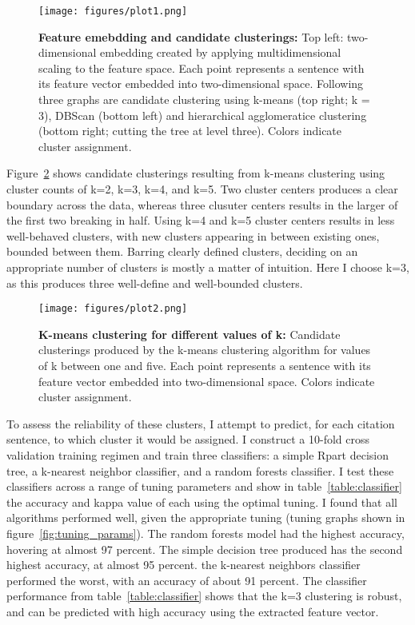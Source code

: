 \documentclass[
10pt, %
a4paper, %
oneside, %
headinclude,footinclude, %
BCOR5mm, %
]{scrartcl}
\begin{document}
\begin{figure}[h]
	\centering
	\texttt{[image: figures/plot1.png]}
	\caption{\textbf{Feature emebdding and candidate clusterings:} Top left: two-dimensional embedding created by applying multidimensional scaling to the feature space. Each point represents a sentence with its feature vector embedded into two-dimensional space. Following three graphs are candidate clustering using k-means (top right; k = 3), DBScan (bottom left) and hierarchical agglomeratice clustering (bottom right; cutting the tree at level three). Colors indicate cluster assignment.}
	\label{fig:embedding_clustering}
\end{figure}

Figure~\ref{fig:kmeans_vis} shows candidate clusterings resulting from k-means clustering using cluster counts of k=2, k=3, k=4, and k=5. Two cluster centers produces a clear boundary across the data, whereas three clusuter centers results in the larger of the first two breaking in half. Using k=4 and k=5 cluster centers results in less well-behaved clusters, with new clusters appearing in between existing ones, bounded between them. Barring clearly defined clusters, deciding on an appropriate number of clusters is mostly a matter of intuition. Here I choose k=3, as this produces three well-define and well-bounded clusters. 

\begin{figure}[h]
	\centering
	\texttt{[image: figures/plot2.png]}
	\caption{\textbf{K-means clustering for different values of k:} Candidate clusterings produced by the k-means clustering algorithm for values of k between one and five. Each point represents a sentence with its feature vector embedded into two-dimensional space. Colors indicate cluster assignment.}
	\label{fig:kmeans_vis}
\end{figure}

To assess the reliability of these clusters, I attempt to predict, for each citation sentence, to which cluster it would be assigned. I construct a 10-fold cross validation training regimen and train three classifiers: a simple Rpart decision tree, a k-nearest neighbor classifier, and a random forests classifier. I test these classifiers across a range of tuning parameters and show in table~\ref{table:classifier} the accuracy and kappa value of each using the optimal tuning. I found that all algorithms performed well, given the appropriate tuning (tuning graphs shown in figure~\ref{fig:tuning_params}). The random forests model had the highest accuracy, hovering at almost 97 percent. The simple decision tree produced has the second highest accuracy, at almost 95 percent. the k-nearest neighbors classifier performed the worst, with an accuracy of about 91 percent. The classifier performance from table~\ref{table:classifier} shows that the k=3 clustering  is robust, and can be predicted with high accuracy using the extracted feature vector. 
\end{document}
